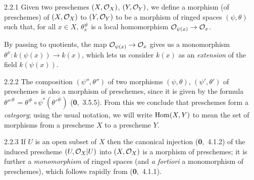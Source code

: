 \documentclass[../main.tex]{subfiles}
\begin{document}
\begin{cx}[Definition]{2.2.1}
    Given two preschemes $(X,\mathcal{O}_X)$, $(Y,\mathcal{O}_Y)$, we define a morphism (of preschemes) of $(X,\mathcal{O}_X)$ to $(Y,\mathcal{O}_Y)$ to be a morphism of ringed spaces $(\psi,\theta)$ such that, for all $x\in X$, $\theta_x^\#$ is a local homomorphism $\mathcal{O}_{\psi(x)}\to\mathcal{O}_x$.
\end{cx}

By passing to quotients, the map $\mathcal{O}_{\psi(x)}\to\mathcal{O}_x$ gives us a monomorphism $\theta^x\colon k(\psi(x))\to k(x)$, which lets us consider $k(x)$ as an \emph{extension} of the field $k(\psi(x))$.

\begin{cx}{2.2.2}
    The composition $(\psi'',\theta'')$ of two morphisms $(\psi,\theta)$, $(\psi',\theta')$ of preschemes is also a morphism of preschemes, since it is given by the formula $\theta''^\#=\theta^\#\circ\psi^*(\theta'^\#)$ (\textbf{0},~3.5.5).
    From this we conclude that preschemes form a \emph{category}; using the usual notation, we will write $\operatorname*{Hom}(X,Y)$ to mean the set of morphisms from a prescheme $X$ to a prescheme $Y$.
\end{cx}

\begin{cx}[Example]{2.2.3}
    If $U$ is an open subset of $X$ then the canonical injection (\textbf{0},~4.1.2) of the induced prescheme $(U,\mathcal{O}_X|U)$ into $(X,\mathcal{O}_X)$ is a morphism of preschemes; it is further a \emph{monomorphism} of ringed spaces (and \emph{a fortiori} a monomorphism of preschemes), which follows rapidly from (\textbf{0},~4.1.1).
\end{cx}
\end{document}
